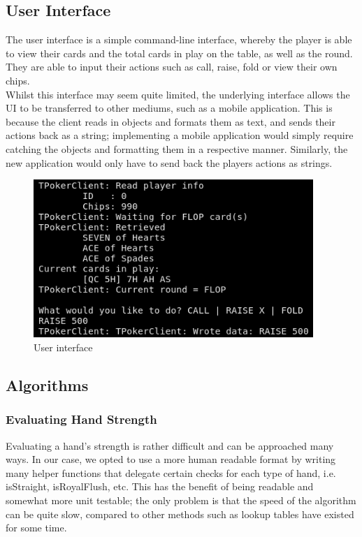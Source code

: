 \documentclass[11pt]{article}
\begin{document}


\newpage
\subsection{User Interface}

The user interface is a simple command-line interface, whereby the player is able to view their cards and the total cards in play on the table, as well as the round. They are able to input their actions such as call, raise, fold or view their own chips. \\

Whilst this interface may seem quite limited, the underlying interface allows the UI to be transferred to other mediums, such as a mobile application. This is because the client reads in objects and formats them as text, and sends their actions back as a string; implementing a mobile application would simply require catching the objects and formatting them in a respective manner. Similarly, the new application would only have to send back the players actions as strings.


\begin{figure}[h]
\begin{center}
\includegraphics[width=300pt]{ui}
\end{center}
\caption{User interface}
\end{figure}

\newpage


\subsection{Algorithms}
\subsubsection{Evaluating Hand Strength}
Evaluating a hand's strength is rather difficult and can be approached many ways. In our case, we opted to use a more human readable format by writing many helper functions that delegate certain checks for each type of hand, i.e. isStraight, isRoyalFlush, etc. This has the benefit of being readable and somewhat more unit testable; the only problem is that the speed of the algorithm can be quite slow, compared to other methods such as lookup tables have existed for some time. \cite{lookup} \\ %
\end{document}
